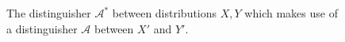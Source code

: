 \begin{figure}
\begin{algorithm}[H]
    \caption{\label{alg.pres-distinguisher}
    The distinguisher $\mathcal{A}^*$
    between distributions $X, Y$
    which makes use of a distinguisher $\mathcal{A}$ between
    $X'$ and $Y'$.}
    \begin{algorithmic}[1]
            \State{}
        \EndFunction
    \end{algorithmic}
\end{algorithm}
\end{figure}
